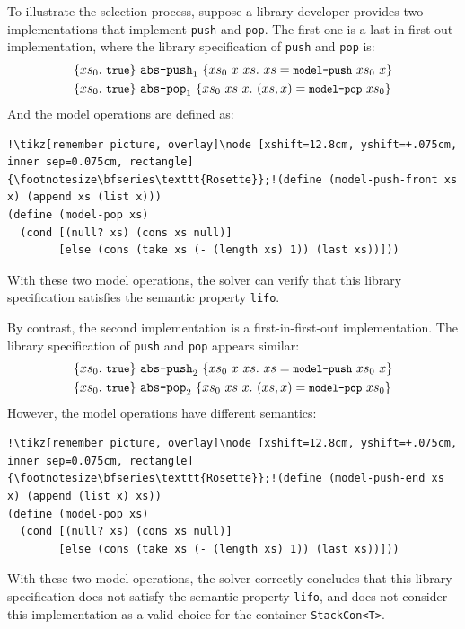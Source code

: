 To illustrate the selection process, suppose a library developer provides two implementations that implement \lstinline|push| and \lstinline|pop|. The first one is a last-in-first-out implementation, where the library specification of \lstinline|push| and \lstinline|pop| is:
\begin{align}
\label{select:lib-spec-lifo}
&\{xs_0.\ \texttt{\small true}\}~\texttt{abs-push}_1~\{xs_0\ x\ xs.\ xs = \texttt{\small model-push}\ xs_0\ x\}\\
&\{xs_0.\ \texttt{\small true}\}~\texttt{abs-pop}_1~\{xs_0\ xs\ x.\ (xs, x) = \texttt{\small model-pop}\ xs_0\}
\end{align}
And the model operations are defined as:
\begin{lstlisting}[language=racket, style=boxed]
!\tikz[remember picture, overlay]\node [xshift=12.8cm, yshift=+.075cm, inner sep=0.075cm, rectangle] {\footnotesize\bfseries\texttt{Rosette}};!(define (model-push-front xs x) (append xs (list x)))
(define (model-pop xs) 
  (cond [(null? xs) (cons xs null)]
        [else (cons (take xs (- (length xs) 1)) (last xs))]))
\end{lstlisting}
With these two model operations, the solver can verify that this library specification satisfies the semantic property \lstinline|lifo|.

By contrast, the second implementation is a first-in-first-out implementation. The library specification of \lstinline|push| and \lstinline|pop| appears similar:
\begin{align}
\label{select:lib-spec-fifo}
&\{xs_0.\ \texttt{\small true}\}~\texttt{abs-push}_2~\{xs_0\ x\ xs.\ xs = \texttt{\small model-push}\ xs_0\ x\}\\
&\{xs_0.\ \texttt{\small true}\}~\texttt{abs-pop}_2~\{xs_0\ xs\ x.\ (xs, x) = \texttt{\small model-pop}\ xs_0\}
\end{align}
However, the model operations have different semantics:
\begin{lstlisting}[language=racket, style=boxed]
!\tikz[remember picture, overlay]\node [xshift=12.8cm, yshift=+.075cm, inner sep=0.075cm, rectangle] {\footnotesize\bfseries\texttt{Rosette}};!(define (model-push-end xs x) (append (list x) xs))
(define (model-pop xs) 
  (cond [(null? xs) (cons xs null)]
        [else (cons (take xs (- (length xs) 1)) (last xs))]))
\end{lstlisting}
With these two model operations, the solver correctly concludes that this library specification does not satisfy the semantic property \lstinline|lifo|, and \Primrose{} does not consider this implementation as a valid choice for the container \lstinline{StackCon<T>}.

